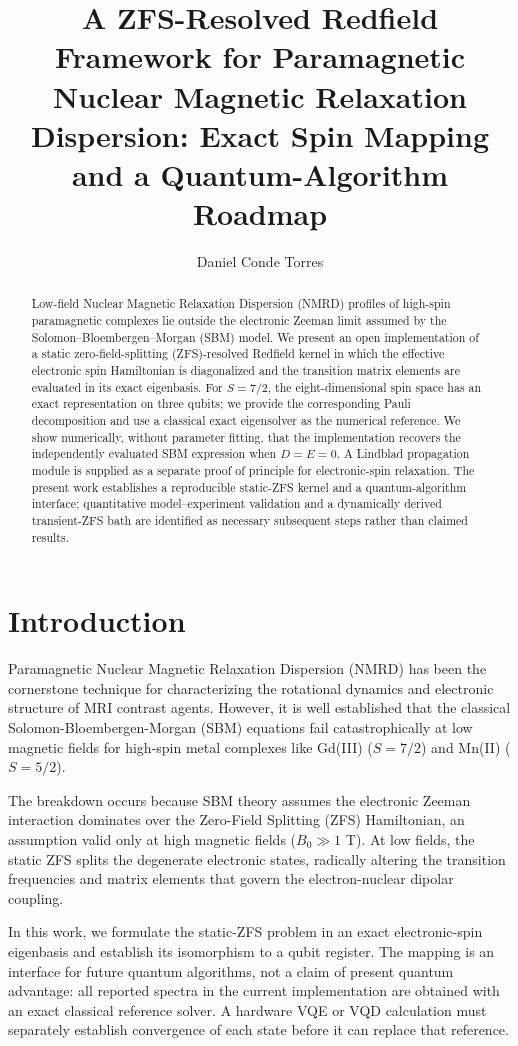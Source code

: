 \documentclass[journal=jctcce,manuscript=article]{achemso}
\author{Daniel Conde Torres}
\affiliation[Institution]{Department of Physical Chemistry, University of Chemistry}
\title{A ZFS-Resolved Redfield Framework for Paramagnetic Nuclear Magnetic Relaxation Dispersion: Exact Spin Mapping and a Quantum-Algorithm Roadmap}
\begin{document}
\begin{abstract}
Low-field Nuclear Magnetic Relaxation Dispersion (NMRD) profiles of high-spin paramagnetic complexes lie outside the electronic Zeeman limit assumed by the Solomon--Bloembergen--Morgan (SBM) model. We present an open implementation of a static zero-field-splitting (ZFS)-resolved Redfield kernel in which the effective electronic spin Hamiltonian is diagonalized and the transition matrix elements are evaluated in its exact eigenbasis. For $S=7/2$, the eight-dimensional spin space has an exact representation on three qubits; we provide the corresponding Pauli decomposition and use a classical exact eigensolver as the numerical reference. We show numerically, without parameter fitting, that the implementation recovers the independently evaluated SBM expression when $D=E=0$. A Lindblad propagation module is supplied as a separate proof of principle for electronic-spin relaxation. The present work establishes a reproducible static-ZFS kernel and a quantum-algorithm interface; quantitative model--experiment validation and a dynamically derived transient-ZFS bath are identified as necessary subsequent steps rather than claimed results.
\end{abstract}

\section{Introduction}
Paramagnetic Nuclear Magnetic Relaxation Dispersion (NMRD) has been the cornerstone technique for characterizing the rotational dynamics and electronic structure of MRI contrast agents.\cite{Solomon1955, Bloembergen1961} However, it is well established that the classical Solomon-Bloembergen-Morgan (SBM) equations fail catastrophically at low magnetic fields for high-spin metal complexes like Gd(III) ($S=7/2$) and Mn(II) ($S=5/2$).\cite{PlatasIglesias2016} 

The breakdown occurs because SBM theory assumes the electronic Zeeman interaction dominates over the Zero-Field Splitting (ZFS) Hamiltonian, an assumption valid only at high magnetic fields ($B_0 \gg 1$ T). At low fields, the static ZFS splits the degenerate electronic states, radically altering the transition frequencies and matrix elements that govern the electron-nuclear dipolar coupling.\cite{Rast2001} 

In this work, we formulate the static-ZFS problem in an exact electronic-spin eigenbasis and establish its isomorphism to a qubit register. The mapping is an interface for future quantum algorithms, not a claim of present quantum advantage: all reported spectra in the current implementation are obtained with an exact classical reference solver. A hardware VQE or VQD calculation must separately establish convergence of each state before it can replace that reference.\cite{VQE2014}
\end{document}
